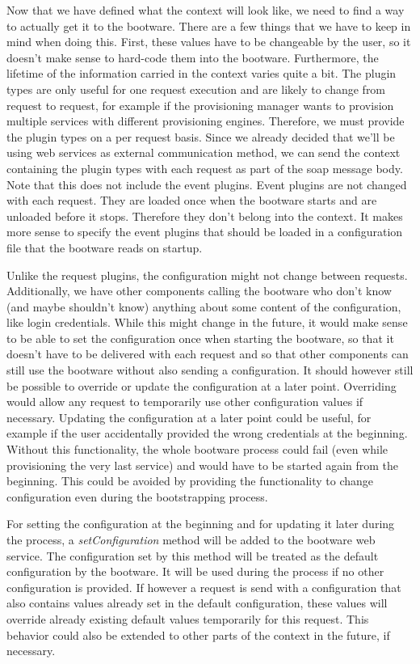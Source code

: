 Now that we have defined what the context will look like, we need to find a way to actually get it to the bootware.
There are a few things that we have to keep in mind when doing this.
First, these values have to be changeable by the user, so it doesn't make sense to hard-code them into the bootware.
Furthermore, the lifetime of the information carried in the context varies quite a bit.
The plugin types are only useful for one request execution and are likely to change from request to request, for example if the provisioning manager wants to provision multiple services with different provisioning engines.
Therefore, we must provide the plugin types on a per request basis.
Since we already decided that we'll be using web services as external communication method, we can send the context containing the plugin types with each request as part of the soap message body.
Note that this does not include the event plugins.
Event plugins are not changed with each request.
They are loaded once when the bootware starts and are unloaded before it stops.
Therefore they don't belong into the context.
It makes more sense to specify the event plugins that should be loaded in a configuration file that the bootware reads on startup.

Unlike the request plugins, the configuration might not change between requests.
Additionally, we have other components calling the bootware who don't know (and maybe shouldn't know) anything about some content of the configuration, like login credentials.
While this might change in the future, it would make sense to be able to set the configuration once when starting the bootware, so that it doesn't have to be delivered with each request and so that other components can still use the bootware without also sending a configuration.
It should however still be possible to override or update the configuration at a later point.
Overriding would allow any request to temporarily use other configuration values if necessary.
Updating the configuration at a later point could be useful, for example if the user accidentally provided the wrong credentials at the beginning.
Without this functionality, the whole bootware process could fail (even while provisioning the very last service) and would have to be started again from the beginning.
This could be avoided by providing the functionality to change configuration even during the bootstrapping process.

For setting the configuration at the beginning and for updating it later during the process, a \textit{setConfiguration} method will be added to the bootware web service.
The configuration set by this method will be treated as the default configuration by the bootware.
It will be used during the process if no other configuration is provided.
If however a request is send with a configuration that also contains values already set in the default configuration, these values will override already existing default values temporarily for this request.
This behavior could also be extended to other parts of the context in the future, if necessary.
